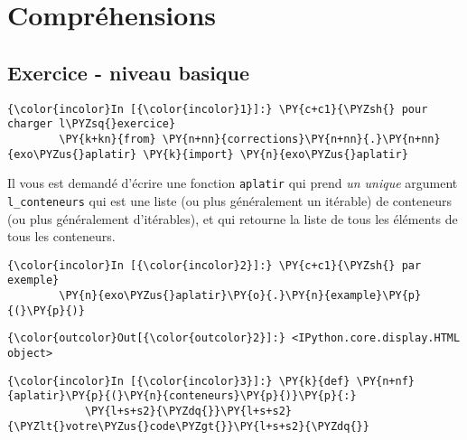     
    
    
    

    

    \hypertarget{compruxe9hensions}{%
\section{Compréhensions}\label{compruxe9hensions}}

    \hypertarget{exercice---niveau-basique}{%
\subsection{Exercice - niveau basique}\label{exercice---niveau-basique}}

    \begin{Verbatim}[commandchars=\\\{\},frame=single,framerule=0.3mm,rulecolor=\color{cellframecolor}]
{\color{incolor}In [{\color{incolor}1}]:} \PY{c+c1}{\PYZsh{} pour charger l\PYZsq{}exercice}
        \PY{k+kn}{from} \PY{n+nn}{corrections}\PY{n+nn}{.}\PY{n+nn}{exo\PYZus{}aplatir} \PY{k}{import} \PY{n}{exo\PYZus{}aplatir}
\end{Verbatim}


    Il vous est demandé d'écrire une fonction \texttt{aplatir} qui prend
\emph{un unique} argument \texttt{l\_conteneurs} qui est une liste (ou
plus généralement un itérable) de conteneurs (ou plus généralement
d'itérables), et qui retourne la liste de tous les éléments de tous les
conteneurs.

    \begin{Verbatim}[commandchars=\\\{\},frame=single,framerule=0.3mm,rulecolor=\color{cellframecolor}]
{\color{incolor}In [{\color{incolor}2}]:} \PY{c+c1}{\PYZsh{} par exemple}
        \PY{n}{exo\PYZus{}aplatir}\PY{o}{.}\PY{n}{example}\PY{p}{(}\PY{p}{)}
\end{Verbatim}


\begin{Verbatim}[commandchars=\\\{\},frame=single,framerule=0.3mm,rulecolor=\color{cellframecolor}]
{\color{outcolor}Out[{\color{outcolor}2}]:} <IPython.core.display.HTML object>
\end{Verbatim}
            
    \begin{Verbatim}[commandchars=\\\{\},frame=single,framerule=0.3mm,rulecolor=\color{cellframecolor}]
{\color{incolor}In [{\color{incolor}3}]:} \PY{k}{def} \PY{n+nf}{aplatir}\PY{p}{(}\PY{n}{conteneurs}\PY{p}{)}\PY{p}{:}
            \PY{l+s+s2}{\PYZdq{}}\PY{l+s+s2}{\PYZlt{}votre\PYZus{}code\PYZgt{}}\PY{l+s+s2}{\PYZdq{}}
\end{Verbatim}


